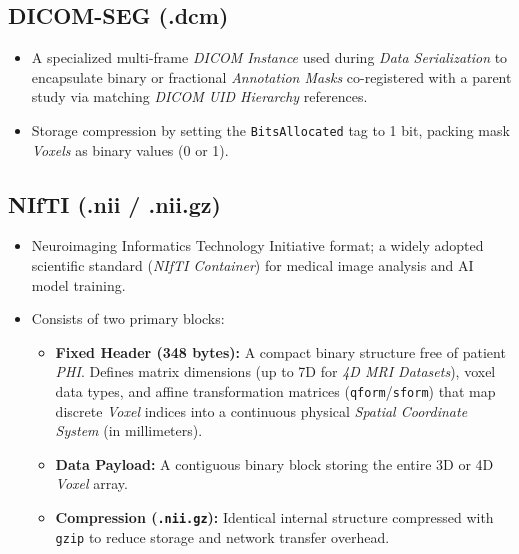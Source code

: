 \documentclass[11pt, a4paper]{article}
\begin{document}
\subsection{DICOM-SEG (.dcm)}
\begin{itemize}
    \item A specialized multi-frame \textit{DICOM Instance} used during \textit{Data Serialization} to encapsulate binary or fractional \textit{Annotation Masks} co-registered with a parent study via matching \textit{DICOM UID Hierarchy} references.
    \item Storage compression by setting the \texttt{BitsAllocated} tag to 1 bit, packing mask \textit{Voxels} as binary values (0 or 1).
\end{itemize}

\subsection{NIfTI (.nii / .nii.gz)}
\begin{itemize}
    \item Neuroimaging Informatics Technology Initiative format; a widely adopted scientific standard (\textit{NIfTI Container}) for medical image analysis and AI model training.
    \item Consists of two primary blocks:
    \begin{itemize}
        \item \textbf{Fixed Header (348 bytes):} A compact binary structure free of patient \textit{PHI}. Defines matrix dimensions (up to 7D for \textit{4D MRI Datasets}), voxel data types, and affine transformation matrices (\texttt{qform}/\texttt{sform}) that map discrete \textit{Voxel} indices into a continuous physical \textit{Spatial Coordinate System} (in millimeters).
        \item \textbf{Data Payload:} A contiguous binary block storing the entire 3D or 4D \textit{Voxel} array.
        \item \textbf{Compression (\texttt{.nii.gz}):} Identical internal structure compressed with \texttt{gzip} to reduce storage and network transfer overhead.
    \end{itemize}
\end{itemize}
\end{document}
